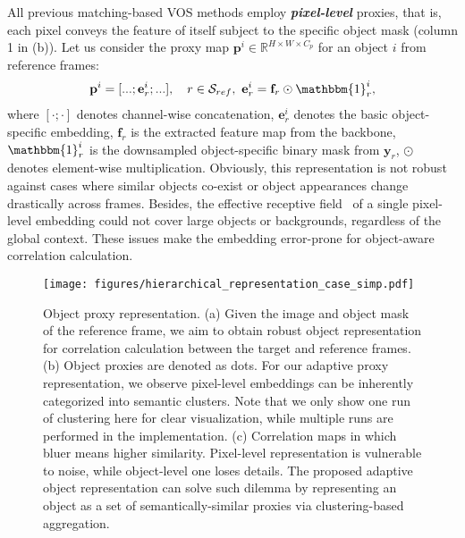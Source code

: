 \documentclass[sigconf]{acmart}
\begin{document}
All previous matching-based VOS methods \cite{voigtlaender2019feelvos,yang2020collaborative,oh2019video,seong2020kernelized,lu2020video,cheng2021modular,liang2020video,hu2018videomatch,duke2021sstvos,mao2021joint} employ \textbf{\textit{pixel-level}} proxies, that is, each pixel conveys the feature of itself subject to the specific object mask (column 1 in \fig{\ref{fig:object_representation}} (b)). Let us consider the proxy map $\mathbf{p}^i \in \mathbb{R}^{H\times W \times C_p}$ for an object $i$ from reference frames:
\begin{eqnarray}
\mathbf{p}^i = [...; \mathbf{e}_{r}^i; ...], \quad r \in \mathcal{S}_{ref}, \text{  } \mathbf{e}_{r}^{i}=\mathbf{f}_{r} \odot  \mathbbm{1}^i_{r},
\end{eqnarray}
where $[\cdot;\cdot]$ denotes channel-wise concatenation, $\mathbf{e}_r^i$ denotes the basic object-specific embedding, $\mathbf{f}_{r}$ is the extracted feature map from the backbone, $\mathbbm{1}_{r}^i$ is the downsampled object-specific binary mask from $\mathbf{y}_r$, $\odot$ denotes element-wise multiplication. 
Obviously, this representation is not robust against cases where similar objects co-exist or object appearances change drastically across frames.
Besides, the effective receptive field~\cite{luo16nipus_erf} of a single pixel-level embedding could not cover large objects or backgrounds, regardless of the global context. These issues make the embedding error-prone for object-aware correlation calculation. 


\begin{figure}[t]
	\centering
	\texttt{[image: figures/hierarchical\_representation\_case\_simp.pdf]}
\caption{Object proxy representation. 
(a) Given the image and object mask of the reference frame, we aim to obtain robust object representation for correlation calculation between the target and reference frames. 
(b) Object proxies are denoted as dots. For our adaptive proxy representation, we observe pixel-level embeddings can be inherently categorized into semantic clusters. Note that we only show one run of clustering here for clear visualization, while multiple runs are performed in the implementation. (c) Correlation maps in which bluer means higher similarity. Pixel-level representation is vulnerable to noise, while object-level one loses details. The proposed adaptive object representation can solve such dilemma by representing an object as a set of semantically-similar proxies via clustering-based aggregation. 
}
	\label{fig:object_representation}
\end{figure}
\end{document}
